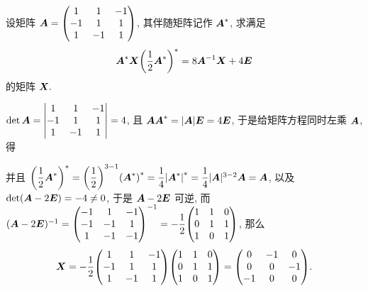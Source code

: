 \begin{example}
    设矩阵 $\vb*{A}=\mqty(1&1&-1\\-1&1&1\\1&-1&1)$, 其伴随矩阵记作 $\vb*{A}^*$, 求满足
    $$\vb*{A}^*\vb*{X}\qty(\dfrac{1}{2}\vb*{A}^*)^*=8\vb*{A}^{-1}\vb*{X}+4\vb*{E}$$ 的矩阵 $\vb*{X}.$
\end{example}
\begin{solution}
    $\det \vb*{A}=\mqty|1&1&-1\\-1&1&1\\1&-1&1|=4$, 且 $\vb*{A}\vb*{A}^*=|\vb*{A}|\vb*{E}=4\vb*{E}$, 于是给矩阵方程同时左乘 $\vb*{A}$, 得
    并且 $\qty(\dfrac{1}{2}\vb*{A}^*)^*=\qty(\dfrac{1}{2})^{3-1}\qty(\vb*{A}^*)^*=\dfrac{1}{4}\qty|\vb*{A}^*|^*=\dfrac{1}{4}|\vb*{A}|^{3-2}\vb*{A}=\vb*{A}$, 以及 $\det(\vb*{A}-2\vb*{E})= -4\neq0$, 于是 $\vb*{A}-2\vb*{E}$ 可逆,
    而 $(\vb*{A}-2\vb*{E})^{-1}=\mqty(-1&1&-1\\-1&-1&1\\1&-1&-1)^{-1}=-\dfrac{1}{2}\mqty(1&1&0\\0&1&1\\1&0&1)$, 那么
    $$\vb*{X}=-\dfrac{1}{2}\mqty(1&1&-1\\-1&1&1\\1&-1&1)\mqty(1&1&0\\0&1&1\\1&0&1)=\mqty(0&-1&0\\0&0&-1\\-1&0&0).$$
\end{solution}

